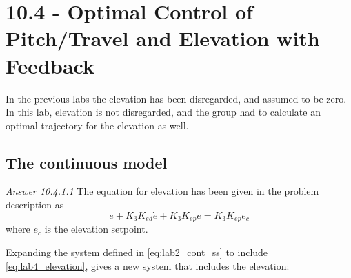 \documentclass[../main.tex]{subfiles}
\begin{document}
\section{10.4 - Optimal Control of Pitch/Travel and Elevation with Feedback}
In the previous labs the elevation has been disregarded, and assumed to be zero. In this lab, elevation is not disregarded, and the group had to calculate an optimal trajectory for the elevation as well. 

\subsection{The continuous model}
\textit{Answer 10.4.1.1}
The equation for elevation has been given in the problem description as
\begin{equation}\label{eq:lab4_elevation}
	\ddot{e} + K_3K_{ed}\dot{e} + K_3K_{ep}e = K_3K_{ep}e_c
\end{equation}
where $ e_c $ is the elevation setpoint.

Expanding the system defined in \cref{eq:lab2_cont_ss} to include \cref{eq:lab4_elevation}, gives a new system that includes the elevation:
\end{document}
